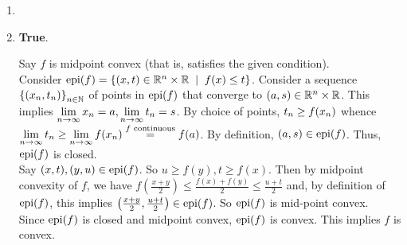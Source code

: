 \begin{enumerate}[leftmargin=*]
\item

\item \textbf{True}.

Say $f$ is midpoint convex (that is, satisfies the given condition). \\
Consider $\epi(f) = \set{(x,t)\in \R^{n}\times\R\st f(x)\leq t}$. Consider a sequence $\left\{(x_{n},t_{n})\right\}_{n\in\mathbb{N}}$ of points in $\text{epi}(f)$ that converge to $(a,s)\in \mathbb{R}^{n}\times\mathbb{R}$. This implies $\displaystyle\lim_{n\to\infty} x_{n} = a, \lim_{n\to\infty} t_{n}=s$. By choice of points, $\displaystyle t_{n}\ge f(x_{n})$ whence $\displaystyle \lim_{n\to\infty} t_{n}\ge \lim_{n\to\infty} f(x_{n}) \stackrel{f \text{ continuous}}{=} f(a)$. By definition, $(a,s)\in\text{epi}(f)$. Thus, $\text{epi}(f)$ is closed. \\
Say $(x,t),(y,u)\in\text{epi}(f)$. So $u\geq f(y), t\geq f(x)$. Then by midpoint convexity of $f$, we have $f\left(\frac{x+y}{2}\right) \leq \frac{f(x)+f(y)}{2} \leq \frac{u+t}{2}$ and, by definition of $\text{epi}(f)$, this implies $\left(\frac{x+y}{2},\frac{u+t}{2}\right)\in \text{epi}(f)$. So $\text{epi}(f)$ is mid-point convex.\\
Since $\text{epi}(f)$ is closed and midpoint convex, $\text{epi}(f)$ is convex. This implies $f$ is convex.
\end{enumerate}




